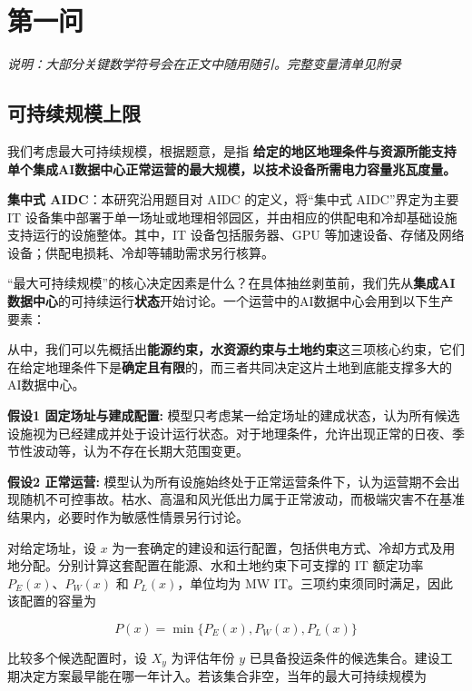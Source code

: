 \section{第一问}

\textit{说明：大部分关键数学符号会在正文中随用随引。完整变量清单见附录}

\subsection{可持续规模上限}

我们考虑最大可持续规模，根据题意，是指 \textbf{给定的地区地理条件与资源所能支持单个集成AI数据中心正常运营的最大规模，以技术设备所需电力容量兆瓦度量。}

\begin{asum}
\textbf{集中式 AIDC}：本研究沿用题目对 AIDC 的定义，将“集中式 AIDC”界定为主要 IT 设备集中部署于单一场址或地理相邻园区，并由相应的供配电和冷却基础设施支持运行的设施整体。其中，IT 设备包括服务器、GPU 等加速设备、存储及网络设备；供配电损耗、冷却等辅助需求另行核算。
\end{asum}

“最大可持续规模”的核心决定因素是什么？在具体抽丝剥茧前，我们先从\textbf{集成AI数据中心}的可持续运行\textbf{状态}开始讨论。一个运营中的AI数据中心会用到以下生产要素：

从中，我们可以先概括出\textbf{能源约束，水资源约束与土地约束}这三项核心约束，它们在给定地理条件下是\textbf{确定且有限}的，而三者共同决定这片土地到底能支撑多大的AI数据中心。

\begin{asum}
\textbf{假设1 固定场址与建成配置:} 模型只考虑某一给定场址的建成状态，认为所有候选设施视为已经建成并处于设计运行状态。对于地理条件，允许出现正常的日夜、季节性波动等，认为不存在长期大范围变更。

\textbf{假设2 正常运营:} 模型认为所有设施始终处于正常运营条件下，认为运营期不会出现随机不可控事故。枯水、高温和风光低出力属于正常波动，而极端灾害不在基准结果内，必要时作为敏感性情景另行讨论。
\end{asum}

对给定场址，设 $x$ 为一套确定的建设和运行配置，包括供电方式、冷却方式及用地分配。分别计算这套配置在能源、水和土地约束下可支撑的 IT 额定功率 $P_E(x)$、$P_W(x)$ 和 $P_L(x)$，单位均为 MW IT。三项约束须同时满足，因此该配置的容量为

\[
P(x) = \min\{P_E(x), P_W(x), P_L(x)\}
\]

比较多个候选配置时，设 $X_y$ 为评估年份 $y$ 已具备投运条件的候选集合。建设工期决定方案最早能在哪一年计入。若该集合非空，当年的最大可持续规模为

